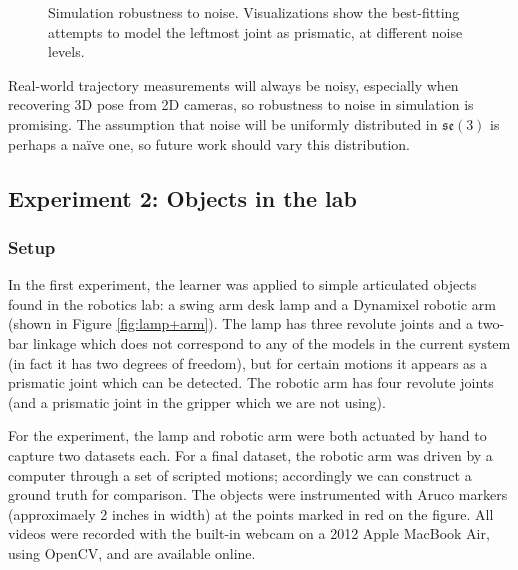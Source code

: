 \documentclass[letterpaper, 10 pt, conference]{ieeeconf}  %
\begin{document}
\begin{figure}[ht]
  \hspace{-.3in}
  \caption{Simulation robustness to noise. Visualizations show the best-fitting attempts to model the leftmost joint as prismatic, at different noise levels.}
  \label{fig:exp1}
\end{figure}

Real-world trajectory measurements will always be noisy, especially when recovering 3D pose from 2D cameras, so robustness to noise in simulation is promising. The assumption that noise will be uniformly distributed in $\mathfrak{se}(3)$ is perhaps a na\"{i}ve one, so future work should vary this distribution.

\subsection{Experiment 2: Objects in the lab}
\subsubsection{Setup}
In the first experiment, the learner was applied to simple articulated objects found in the robotics lab: a swing arm desk lamp and a Dynamixel robotic arm (shown in Figure \ref{fig:lamp+arm}). The lamp has three revolute joints and a two-bar linkage which does not correspond to any of the models in the current system (in fact it has two degrees of freedom), but for certain motions it appears as a prismatic joint which can be detected. The robotic arm has four revolute joints (and a prismatic joint in the gripper which we are not using).

For the experiment, the lamp and robotic arm were both actuated by hand to capture two datasets each. For a final dataset, the robotic arm was driven by a computer through a set of scripted motions; accordingly we can construct a ground truth for comparison. The objects were instrumented with Aruco markers (approximaely 2 inches in width) at the points marked in red on the figure. All videos were recorded with the built-in webcam on a 2012 Apple MacBook Air, using OpenCV, and are available online.
\end{document}
